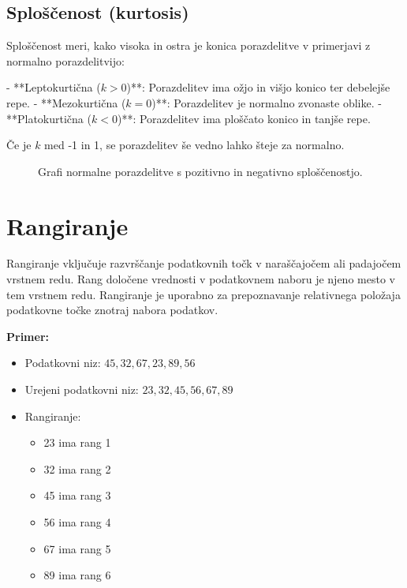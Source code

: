 \subsection{Sploščenost (kurtosis)}

Sploščenost meri, kako visoka in ostra je konica porazdelitve v primerjavi z normalno porazdelitvijo:

- **Leptokurtična ($k > 0$)**: Porazdelitev ima ožjo in višjo konico ter debelejše repe.
- **Mezokurtična ($k = 0$)**: Porazdelitev je normalno zvonaste oblike.
- **Platokurtična ($k < 0$)**: Porazdelitev ima ploščato konico in tanjše repe.

Če je $k$ med -1 in 1, se porazdelitev še vedno lahko šteje za normalno.

\begin{figure}
\centering
{}
\caption{Grafi normalne porazdelitve s pozitivno in negativno sploščenostjo.}
\end{figure}

\section{Rangiranje}

Rangiranje vključuje razvrščanje podatkovnih točk v naraščajočem ali padajočem vrstnem redu. Rang določene vrednosti v podatkovnem naboru je njeno mesto v tem vrstnem redu. Rangiranje je uporabno za prepoznavanje relativnega položaja podatkovne točke znotraj nabora podatkov.

\textbf{Primer:}
\begin{itemize}
    \item Podatkovni niz: $45, 32, 67, 23, 89, 56$
    \item Urejeni podatkovni niz: $23, 32, 45, 56, 67, 89$
    \item Rangiranje: 
    \begin{itemize}
        \item 23 ima rang 1
        \item 32 ima rang 2
        \item 45 ima rang 3
        \item 56 ima rang 4
        \item 67 ima rang 5
        \item 89 ima rang 6
    \end{itemize}
\end{itemize}

